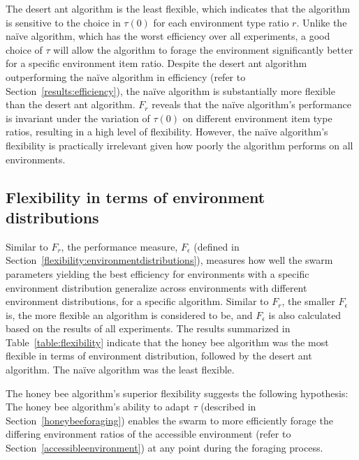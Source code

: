 The desert ant algorithm is the least flexible, which indicates that the algorithm is sensitive to the choice in $\tau(0)$ for each environment type ratio $r$. Unlike the na\"ive algorithm, which has the worst efficiency over all experiments, a good choice of $\tau$ will allow the algorithm to forage the environment significantly better for a specific environment item ratio. Despite the desert ant algorithm outperforming the na\"ive algorithm in efficiency (refer to Section~\ref{results:efficiency}), the na\"ive algorithm is substantially more flexible than the desert ant algorithm. $F_r$ reveals that the na\"ive algorithm's performance is invariant under the variation of $\tau(0)$ on different environment item type ratios, resulting in a high level of flexibility. However, the na\"ive algorithm's flexibility is practically irrelevant given how poorly the algorithm performs on all environments. 


\subsection{Flexibility in terms of environment distributions}
\label{results:flexibility:environmentdistribution}

Similar to $F_r$, the performance measure, $F_\epsilon$ (defined in Section~\ref{flexibility:environmentdistributions}), measures how well the swarm parameters yielding the best efficiency for environments with a specific environment distribution generalize across environments with different environment distributions, for a specific algorithm. Similar to $F_r$, the smaller $F_\epsilon$ is, the more flexible an algorithm is considered to be, and $F_\epsilon$ is also calculated based on the results of all experiments. The results summarized in Table~\ref{table:flexibility} indicate that the honey bee algorithm was the most flexible in terms of environment distribution, followed by the desert ant algorithm. The na\"ive algorithm was the least flexible.

The honey bee algorithm's superior flexibility suggests the following hypothesis: The honey bee algorithm's ability to adapt $\tau$ (described in Section~\ref{honeybeeforaging}) enables the swarm to more efficiently forage the differing environment ratios of the accessible environment (refer to Section~\ref{accessibleenvironment}) at any point during the foraging process.

